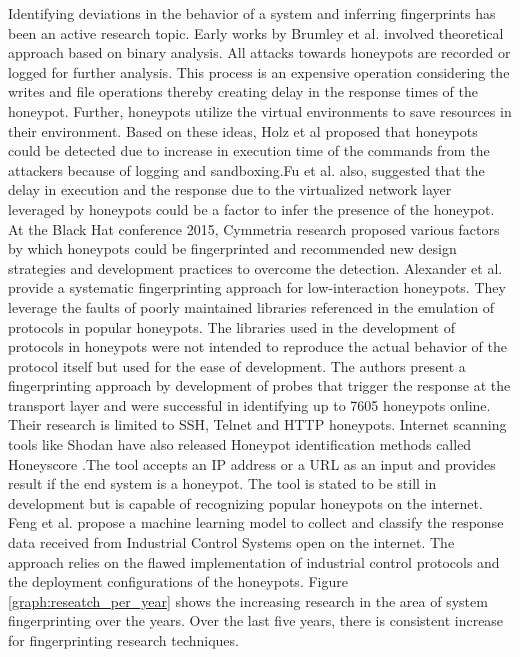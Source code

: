 \documentclass[letterpaper, 10 pt, conference]{ieeeconf}  %
\begin{document}
Identifying deviations in the behavior of a system and inferring fingerprints has been an active research topic. Early works by Brumley et al. \cite{Brumley} involved theoretical approach based on binary analysis. All attacks towards honeypots are recorded or logged for further analysis. This process is an expensive operation considering the writes and file operations thereby creating delay in the response times of the honeypot. Further, honeypots utilize the virtual environments to save resources in their environment. Based on these ideas, Holz et al \cite{Holz} proposed that honeypots could be detected due to increase in execution time of the commands from the attackers because of logging and sandboxing.Fu et al. \cite{Fu} also, suggested that the delay in execution and the response due to the virtualized network layer leveraged by honeypots could be a factor to infer the presence of the honeypot. At the Black Hat conference 2015, Cymmetria research \cite{BLACKHAT} proposed various factors by which honeypots could be fingerprinted and recommended new design strategies and development practices to overcome the detection. Alexander et al. \cite{Vetterl2018} provide a systematic fingerprinting approach for low-interaction honeypots. They leverage the faults of poorly maintained libraries referenced in the emulation of protocols in popular honeypots. The libraries used in the development of protocols in honeypots were not intended to reproduce the actual behavior of the protocol itself but used for the ease of development. The authors present a fingerprinting approach by development of probes that trigger the response at the transport layer and were successful in identifying up to 7605 honeypots online. Their research is limited to SSH, Telnet and HTTP honeypots. Internet scanning tools like Shodan have also released Honeypot identification methods called Honeyscore \cite{SHODAN}.The tool accepts an IP address or a URL as an input and provides result if the end system is a honeypot. The tool is stated to be still in development but is capable of recognizing popular honeypots on the internet. Feng et al. \cite{Feng2016} propose a machine learning model to collect and classify the response data received from Industrial Control Systems open on the internet. The approach relies on the flawed implementation of industrial control protocols and the deployment configurations of the honeypots. Figure \ref{graph:reseatch_per_year} shows the increasing research in the area of system fingerprinting over the years. Over the last five years, there is consistent increase for fingerprinting research techniques. 
\end{document}

